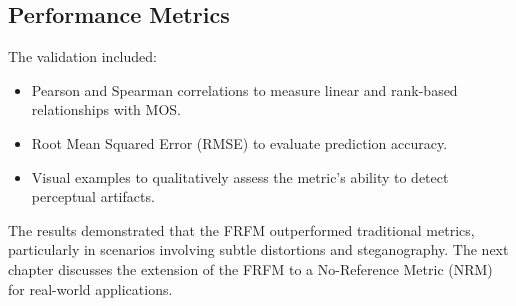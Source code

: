 \subsection{Performance Metrics}

The validation included:
\begin{itemize}
    \item Pearson and Spearman correlations to measure linear and rank-based relationships with MOS.
    \item Root Mean Squared Error (RMSE) to evaluate prediction accuracy.
    \item Visual examples to qualitatively assess the metric's ability to detect perceptual artifacts.
\end{itemize}

The results demonstrated that the FRFM outperformed traditional metrics, particularly in scenarios involving subtle distortions and steganography. The next chapter discusses the extension of the FRFM to a No-Reference Metric (NRM) for real-world applications.
